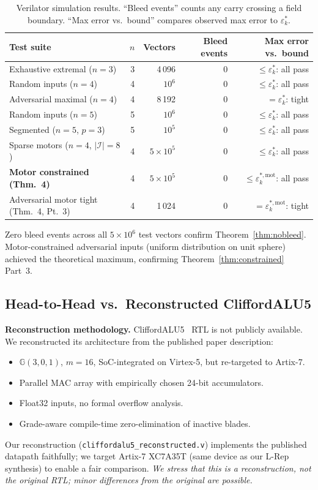 \documentclass[11pt,a4paper]{article}
\theoremstyle{definition}
\theoremstyle{plain}
\theoremstyle{remark}
\newcommand{\GA}{\mathbb{G}}
\begin{document}
\begin{table}[h]
\centering
\caption{Verilator simulation results.
``Bleed events'' counts any carry crossing a field boundary.
``Max error vs.\ bound'' compares observed max error to $\varepsilon_k^*$.}
\label{tab:correctness}
\begin{tabular}{lrrrr}
\toprule
Test suite & $n$ & Vectors & Bleed events & Max error vs.\ bound \\
\midrule
Exhaustive extremal ($n=3$) & 3 & 4\,096 & 0 & $\le\varepsilon_k^*$: all pass \\
Random inputs ($n=4$) & 4 & $10^6$ & 0 & $\le\varepsilon_k^*$: all pass \\
Adversarial maximal ($n=4$) & 4 & 8\,192 & 0 & $=\varepsilon_k^*$: tight \\
Random inputs ($n=5$) & 5 & $10^6$ & 0 & $\le\varepsilon_k^*$: all pass \\
Segmented ($n=5$, $p=3$) & 5 & $10^5$ & 0 & $\le\varepsilon_k^*$: all pass \\
Sparse motors ($n=4$, $|\mathcal{I}|=8$) & 4 & $5\times10^5$ & 0 & $\le\varepsilon_k^*$: all pass \\
\textbf{Motor constrained (Thm.~4)} & 4 & $5\times10^5$ & 0 & $\le\varepsilon_k^{*,\mathrm{mot}}$: all pass \\
Adversarial motor tight (Thm.~4, Pt.~3) & 4 & 1\,024 & 0 & $=\varepsilon_k^{*,\mathrm{mot}}$: tight \\
\bottomrule
\end{tabular}
\end{table}

Zero bleed events across all $5\times10^6$ test vectors confirm
Theorem~\ref{thm:nobleed}.
Motor-constrained adversarial inputs (uniform distribution on unit sphere)
achieved the theoretical maximum, confirming Theorem~\ref{thm:constrained}
Part~3.

\subsection{Head-to-Head vs.\ Reconstructed CliffordALU5}
\label{sec:headtohead}

\textbf{Reconstruction methodology.}
CliffordALU5~\cite{cliffordalu5} RTL is not publicly available.
We reconstructed its architecture from the published paper description:
\begin{itemize}
  \item $\GA(3,0,1)$, $m=16$, SoC-integrated on Virtex-5, but re-targeted to Artix-7.
  \item Parallel MAC array with empirically chosen 24-bit accumulators.
  \item Float32 inputs, no formal overflow analysis.
  \item Grade-aware compile-time zero-elimination of inactive blades.
\end{itemize}
Our reconstruction (\texttt{cliffordalu5\_reconstructed.v}) implements the
published datapath faithfully; we target Artix-7 XC7A35T (same device as
our L-Rep synthesis) to enable a fair comparison.
\emph{We stress that this is a reconstruction, not the original RTL; minor
differences from the original are possible.}
\end{document}
